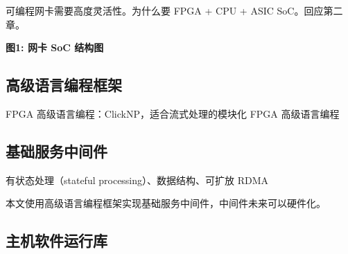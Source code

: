 可编程网卡需要高度灵活性。为什么要 FPGA + CPU + ASIC SoC。回应第二章。

\textbf{图1: 网卡 SoC 结构图}

\subsection{高级语言编程框架}

FPGA 高级语言编程：ClickNP，适合流式处理的模块化 FPGA 高级语言编程

\subsection{基础服务中间件}

有状态处理（stateful processing）、数据结构、可扩放 RDMA

本文使用高级语言编程框架实现基础服务中间件，中间件未来可以硬件化。

\subsection{主机软件运行库}

